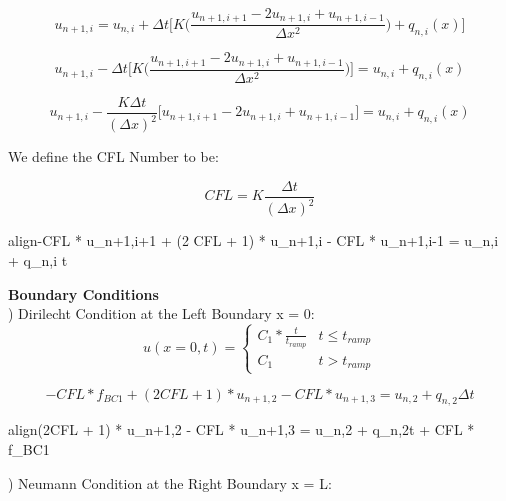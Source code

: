 \documentclass[10pt, letter, showtrims]{extarticle}
\newcommand{\boxedeq}[2]{\begin{empheq}[box={\fboxsep=6pt\fbox}]{align}\label{#1}#2\end{empheq}}
\begin{document}
		\begin{equation}
			u_{n+1,i} = u_{n,i} + \Delta t \big[ K \big(\frac{u_{n+1,i+1} - 2 u_{n+1,i} + u_{n+1,i-1}}{\Delta x^{2}} \big) + q_{n,i}(x)\big]
		\end{equation}
		
		\begin{equation}
			u_{n+1,i} - \Delta t \big[ K \big(\frac{u_{n+1,i+1} - 2 u_{n+1,i} + u_{n+1,i-1}}{\Delta x^{2}} \big)\big] =  u_{n,i} + q_{n,i}(x)
		\end{equation}
		
		\begin{equation}
			u_{n+1,i} - \frac{K \Delta t}{(\Delta x)^{2}} \big[ u_{n+1,i+1} - 2 u_{n+1,i} + u_{n+1,i-1} \big] =  u_{n,i} + q_{n,i}(x)
		\end{equation}
		
		\noindent
		We define the CFL Number to be:
		
		\begin{equation}
			CFL = K \frac{\Delta t}{(\Delta x)^{2}}
		\end{equation}
		
		\boxedeq{}{-CFL * u_{n+1,i+1} + (2 CFL + 1) * u_{n+1,i} - CFL * u_{n+1,i-1} = u_{n,i} + q_{n,i} \Delta t}
		
		\noindent
		\textbf{Boundary Conditions} \\
		
		) Dirilecht Condition at the Left Boundary x = 0:	\\
		
		\begin{equation}
			u(x=0, t) = \begin{cases} 
          					C_{1} * \frac{t}{t_{ramp}} & t\leq t_{ramp} \\
          					C_{1}                      & t > t_{ramp}
       					\end{cases}
    		\end{equation}
    		
    		\begin{equation}
			-CFL * f_{BC1} + (2CFL + 1) * u_{n+1,2} - CFL * u_{n+1,3} = u_{n,2} + q_{n,2}\Delta t
		\end{equation} 
		
		\boxedeq{}{(2CFL + 1) * u_{n+1,2} - CFL * u_{n+1,3} = u_{n,2} + q_{n,2}\Delta t + CFL * f_{BC1}} 
		
		\pagebreak
		
		) Neumann Condition at the Right Boundary x = L: \\
		
\end{document}
